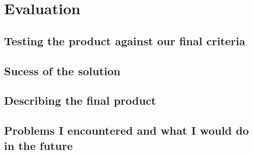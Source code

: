 \documentclass[9pt]{article}
\begin{document}
\newpage
\section{Evaluation}












\newpage
\subsection{Testing the product against our final criteria}











\newpage
\subsection{Sucess of the solution}











\newpage
\subsection{Describing the final product}












\newpage
\subsection{Problems I encountered and what I would do in the future}











\newpage
{}


\newpage
\listoffigures
\end{document}
